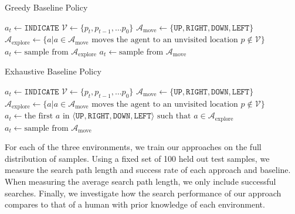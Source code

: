 \begin{algorithm}
    \caption{Greedy Baseline Policy}
    \label{alg:greedy}
    \begin{algorithmic}
            \State \(a_t \leftarrow \mathtt{INDICATE}\)
        \Else
            \State \(\mathcal{V} \leftarrow \{p_t, p_{t-1}, \dots p_0\}\)
            \State \(\mathcal{A}_{\text{move}} \leftarrow \{\mathtt{UP}, \mathtt{RIGHT}, \mathtt{DOWN}, \mathtt{LEFT}\}\)
            \State \(\mathcal{A}_{\text{explore}} \leftarrow \{a | a \in \mathcal{A}_{\text{move}} \text{ moves the agent to an unvisited location } p \notin \mathcal{V}\}\) 
                \State \(a_t \leftarrow \text{sample from } \mathcal{A}_{\text{explore}}\)
            \Else
                \State \(a_t \leftarrow \text{sample from } \mathcal{A}_{\text{move}}\)
            \EndIf
        \EndIf
    \end{algorithmic}
\end{algorithm}

\begin{algorithm}
    \caption{Exhaustive Baseline Policy}
    \label{alg:exhaustive}
    \begin{algorithmic}
            \State \(a_t \leftarrow \mathtt{INDICATE}\)
        \Else
            \State \(\mathcal{V} \leftarrow \{p_t, p_{t-1}, \dots p_0\}\)
            \State \(\mathcal{A}_{\text{move}} \leftarrow \{\mathtt{UP}, \mathtt{RIGHT}, \mathtt{DOWN}, \mathtt{LEFT}\}\)
            \State \(\mathcal{A}_{\text{explore}} \leftarrow \{a | a \in \mathcal{A}_{\text{move}} \text{ moves the agent to an unvisited location } p \notin \mathcal{V}\}\) 
                \State \(a_t \leftarrow \text{the first } a \text{ in } \langle \mathtt{UP}, \mathtt{RIGHT}, \mathtt{DOWN}, \mathtt{LEFT} \rangle \text{ such that } a \in \mathcal{A}_{\text{explore}}\)
            \Else
                \State \(a_t \leftarrow \text{sample from } \mathcal{A}_{\text{move}}\)
            \EndIf
        \EndIf
    \end{algorithmic}
\end{algorithm}

For each of the three environments, we train our approaches on the full distribution of samples.
Using a fixed set of 100 held out test samples, we measure the search path length and success rate of each approach and baseline.
When measuring the average search path length, we only include successful searches.
Finally, we investigate how the search performance of our approach compares to that of a human with prior knowledge of each environment.

